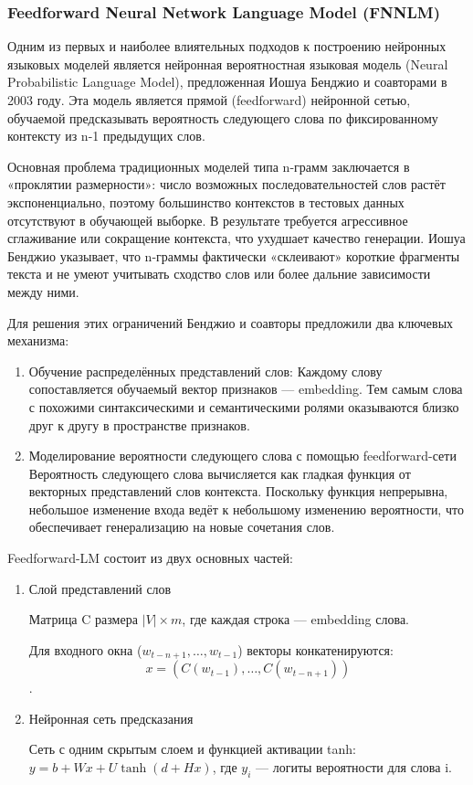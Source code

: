 \documentclass[coursework]{SCWorks}
\begin{document}
    \subsubsection{Feedforward Neural Network Language Model (FNNLM)}


    Одним из первых и наиболее влиятельных подходов к построению нейронных языковых моделей является {нейронная вероятностная языковая
    модель} (Neural Probabilistic Language Model), предложенная Иошуа Бенджио и соавторами в 2003 году.
    Эта модель является прямой (feedforward) нейронной сетью, обучаемой предсказывать вероятность следующего слова по фиксированному
    контексту из n-1 предыдущих слов.

    Основная проблема традиционных моделей типа n-грамм заключается в «проклятии размерности»:
    число возможных последовательностей слов растёт экспоненциально, поэтому большинство контекстов в тестовых данных отсутствуют
    в обучающей выборке.
    В результате требуется агрессивное сглаживание или сокращение контекста, что ухудшает качество генерации.
    Иошуа Бенджио указывает, что n-граммы фактически «склеивают» короткие фрагменты текста и не умеют учитывать сходство слов или более
    дальние зависимости между ними.

    Для решения этих ограничений Бенджио и соавторы предложили два ключевых механизма:
    \begin{enumerate}
        \item Обучение распределённых представлений слов:
        Каждому слову сопоставляется обучаемый вектор признаков — embedding.
        Тем самым слова с похожими синтаксическими и семантическими ролями оказываются близко друг к другу в пространстве признаков.
        \item {Моделирование вероятности следующего слова с помощью feedforward-сети}
        Вероятность следующего слова вычисляется как гладкая функция от векторных представлений слов контекста.
        Поскольку функция непрерывна, небольшое изменение входа ведёт к небольшому изменению вероятности, что обеспечивает
        генерализацию на новые сочетания слов.
    \end{enumerate}

    Feedforward-LM состоит из двух основных частей:
    \begin{enumerate}
        \item {Слой представлений слов}

        Матрица C размера $|V| \times m$, где каждая строка — embedding слова.

        Для входного окна ($w_{t-n+1}, \dots, w_{t-1}$) векторы конкатенируются:
        \[x = (C(w_{t-1}), \ldots, C(w_{t-n+1}))\].
        \item {Нейронная сеть предсказания}

        Сеть с одним скрытым слоем и функцией активации tanh:
        $y = b + Wx + U \tanh(d + Hx)$,
        где $y_i$ — логиты вероятности для слова i.
    \end{enumerate}
\end{document}
